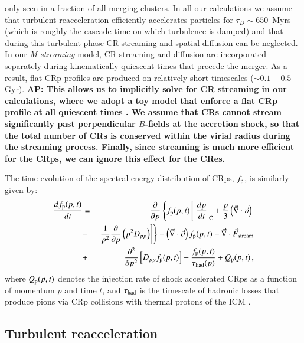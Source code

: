 \documentclass[useAMS,usenatbib]{mn2e}
\newcommand{\Mstream}{{\it M-streaming}\xspace}
\def\AP#1{{\bf  AP: #1}}
\begin{document}
only seen in a fraction of all merging clusters. In all our
calculations we assume that turbulent reacceleration efficiently
accelerates particles for $\tau_D\sim650$~Myrs (which is roughly the
cascade time on which turbulence is damped) and that during this
turbulent phase CR streaming and spatial diffusion can be
neglected. In our \Mstream model, CR streaming and diffusion are
incorporated separately during kinematically quiescent times that
precede the merger. As a result, flat CRp profiles are produced on
relatively short timescales ($\sim 0.1-0.5$ Gyr). \AP{This allows us
  to implicitly solve for CR streaming in our calculations, where we
  adopt a toy model that enforce a flat CRp profile at all quiescent
  times \citep{wiener13}. We assume that CRs cannot stream
  significantly past perpendicular $B$-fields at the accretion shock,
  so that the total number of CRs is conserved within the virial
  radius during the streaming process. Finally, since streaming is
  much more efficient for the CRps, we can ignore this effect for the
  CRes.}

The time evolution of the spectral energy distribution of CRps,
$f_{{\mathrm{p}}}$, is similarly given by:
\begin{eqnarray}
{{d f_{{\mathrm{p}}}(p,t)}\over{d t}} &=&
{{\partial }\over{\partial p}}
\left\{
f_{{\mathrm{p}}}(p,t)\left[ \left|{{dp}\over{dt}}\right|_{\rm C}
+ \frac{p}{3}\left(\vec{\nabla}\cdot \vec{\upsilon}\right)\right.\right.
\nonumber\\
&-&\left.\left. {1\over{p^2}}{{\partial }\over{\partial p}}\left(p^2 D_{pp}\right)
\right]\right\} - \left(\vec{\nabla}\cdot \vec{\upsilon}\right) f_{{\mathrm{p}}}(p,t)
- \vec{\nabla}\cdot \vec{F}_{\mathrm{stream}}
\nonumber\\
&+& {{\partial^2 }\over{\partial p^2}}
\left[ D_{pp} f_{{\mathrm{p}}}(p,t) \right] - {{f_{{\mathrm{p}}}(p,t)}\over{\tau_{\rm had}(p)}}
+ Q_{{\mathrm{p}}}(p,t)\, ,
\label{eq:FP_p}
\end{eqnarray}
where $Q_{{\mathrm{p}}}(p,t)$ denotes the injection rate of shock
accelerated CRps as a function of momentum $p$ and time $t$, and
$\tau_{\rm had}$ is the timescale of hadronic losses that produce
pions via CRp collisions with thermal protons of the ICM
\cite[e.g.][]{brunetti11}.  


\subsection{Turbulent reacceleration}
\end{document}
